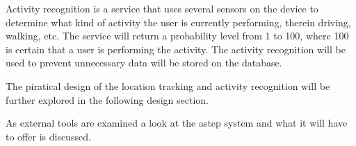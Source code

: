 Activity recognition is a service that uses several sensors on the device to determine what kind of activity the user is currently performing, therein driving, walking, etc.
The service will return a probability level from 1 to 100, where 100 is certain that a user is performing the activity.
The activity recognition will be used to prevent unnecessary data will be stored on the database. 


The piratical design of the location tracking and activity recognition will be further explored in the following design section.

As external tools are examined a look at the \gls{astep} system and what it will have to offer is discussed.